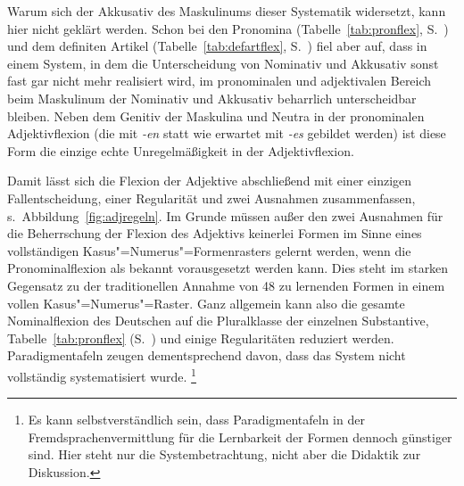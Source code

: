 Warum sich der Akkusativ des Maskulinums dieser Systematik widersetzt, kann hier nicht geklärt werden.
Schon bei den Pronomina (Tabelle~\ref{tab:pronflex}, S.~\pageref{tab:pronflex}) und dem definiten Artikel (Tabelle~\ref{tab:defartflex}, S.~\pageref{tab:defartflex}) fiel aber auf, dass in einem System, in dem die Unterscheidung von Nominativ und Akkusativ sonst fast gar nicht mehr realisiert wird, im pronominalen und adjektivalen Bereich beim Maskulinum der Nominativ und Akkusativ beharrlich unterscheidbar bleiben.
Neben dem Genitiv der Maskulina und Neutra in der pronominalen Adjektivflexion (die mit \textit{-en} statt wie erwartet mit \textit{-es} gebildet werden) ist diese Form die einzige echte Unregelmäßigkeit in der Adjektivflexion.

Damit lässt sich die Flexion der Adjektive abschließend mit einer einzigen Fallentscheidung, einer Regularität und zwei Ausnahmen zusammenfassen, s.\ Abbildung~\ref{fig:adjregeln}.
Im Grunde müssen außer den zwei Ausnahmen für die Beherrschung der Flexion des Adjektivs keinerlei Formen im Sinne eines vollständigen Kasus"=Numerus"=Formenrasters gelernt werden, wenn die Pronominalflexion als bekannt vorausgesetzt werden kann.
Dies steht im starken Gegensatz zu der traditionellen Annahme von 48 zu lernenden Formen in einem vollen Kasus"=Numerus"=Raster.
Ganz allgemein kann also die gesamte Nominalflexion des Deutschen auf die Pluralklasse der einzelnen Substantive, Tabelle~\ref{tab:pronflex} (S.~\pageref{tab:pronflex}) und einige Regularitäten reduziert werden.
Paradigmentafeln zeugen dementsprechend davon, dass das System nicht vollständig systematisiert wurde.%
\footnote{Es kann selbstverständlich sein, dass Paradigmentafeln \zB in der Fremdsprachenvermittlung für die Lernbarkeit der Formen dennoch günstiger sind.
Hier steht nur die Systembetrachtung, nicht aber die Didaktik zur Diskussion.}

